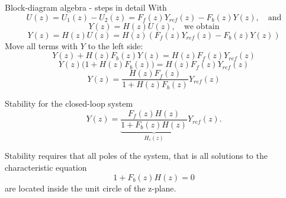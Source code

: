 \documentclass[presentation,aspectratio=169]{beamer}
\begin{document}
\begin{frame}[label={sec:org552a277}]{Block-diagram algebra - steps in detail}
With \[U(z) = U_1(z) - U_2(z) = F_f(z)Y_{ref}(z) - F_b(z)Y(z), \quad \text{and}\]
\[ Y(z) = H(z)U(z), \quad \text{we obtain} \]
\[ Y(z) = H(z)U(z) = H(z)\left(F_f(z)Y_{ref}(z) - F_b(z)Y(z)\right)\]
Move all terms with \(Y\) to the left side:
\[ Y(z) + H(z)F_b(z)Y(z) = H(z)F_f(z)Y_{ref}(z)\]
\[ Y(z)\big(1 + H(z)F_b(z)\big) = H(z)F_f(z)Y_{ref}(z)\]
\[ Y(z) = \frac{H(z)F_f(z)}{1 + H(z)F_b(z)}Y_{ref}(z)\]
\end{frame}

\begin{frame}[label={sec:org276cf5f}]{Stability for the closed-loop system}
\[ Y(z) = \underbrace{\frac{F_f(z)H(z)}{1 + F_b(z)H(z)}}_{H_c(z)} Y_{ref}(z). \]

\begin{tcolorbox}
Stability requires that all poles of the system, that is all solutions to the characteristic equation
\[ 1 + F_b(z)H(z) = 0\]
are located inside the unit circle of the  z-plane.
\end{tcolorbox}
\end{frame}
\end{document}
